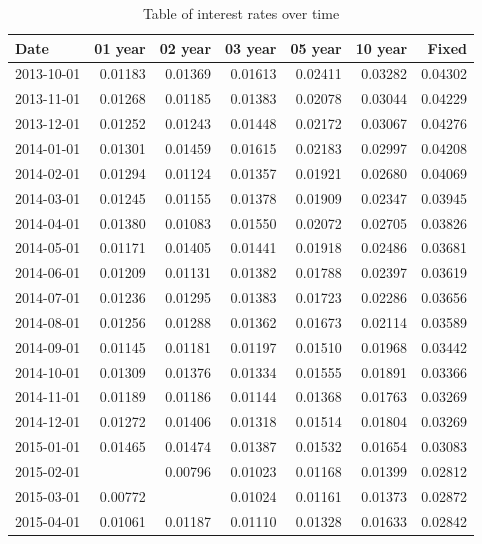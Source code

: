 \documentclass[
]{book}
\begin{document}
\begin{table}

\caption{\label{tab:unnamed-chunk-6}Table of interest rates over time}
\centering
\begin{tabular}[t]{l|r|r|r|r|r|r}
\hline
Date & 01 year & 02 year & 03 year & 05 year & 10 year & Fixed\\
\hline
2013-10-01 & 0.01183 & 0.01369 & 0.01613 & 0.02411 & 0.03282 & 0.04302\\
\hline
2013-11-01 & 0.01268 & 0.01185 & 0.01383 & 0.02078 & 0.03044 & 0.04229\\
\hline
2013-12-01 & 0.01252 & 0.01243 & 0.01448 & 0.02172 & 0.03067 & 0.04276\\
\hline
2014-01-01 & 0.01301 & 0.01459 & 0.01615 & 0.02183 & 0.02997 & 0.04208\\
\hline
2014-02-01 & 0.01294 & 0.01124 & 0.01357 & 0.01921 & 0.02680 & 0.04069\\
\hline
2014-03-01 & 0.01245 & 0.01155 & 0.01378 & 0.01909 & 0.02347 & 0.03945\\
\hline
2014-04-01 & 0.01380 & 0.01083 & 0.01550 & 0.02072 & 0.02705 & 0.03826\\
\hline
2014-05-01 & 0.01171 & 0.01405 & 0.01441 & 0.01918 & 0.02486 & 0.03681\\
\hline
2014-06-01 & 0.01209 & 0.01131 & 0.01382 & 0.01788 & 0.02397 & 0.03619\\
\hline
2014-07-01 & 0.01236 & 0.01295 & 0.01383 & 0.01723 & 0.02286 & 0.03656\\
\hline
2014-08-01 & 0.01256 & 0.01288 & 0.01362 & 0.01673 & 0.02114 & 0.03589\\
\hline
2014-09-01 & 0.01145 & 0.01181 & 0.01197 & 0.01510 & 0.01968 & 0.03442\\
\hline
2014-10-01 & 0.01309 & 0.01376 & 0.01334 & 0.01555 & 0.01891 & 0.03366\\
\hline
2014-11-01 & 0.01189 & 0.01186 & 0.01144 & 0.01368 & 0.01763 & 0.03269\\
\hline
2014-12-01 & 0.01272 & 0.01406 & 0.01318 & 0.01514 & 0.01804 & 0.03269\\
\hline
2015-01-01 & 0.01465 & 0.01474 & 0.01387 & 0.01532 & 0.01654 & 0.03083\\
\hline
2015-02-01 &  & 0.00796 & 0.01023 & 0.01168 & 0.01399 & 0.02812\\
\hline
2015-03-01 & 0.00772 &  & 0.01024 & 0.01161 & 0.01373 & 0.02872\\
\hline
2015-04-01 & 0.01061 & 0.01187 & 0.01110 & 0.01328 & 0.01633 & 0.02842\\

\end{tabular}
\end{table}
\end{document}
